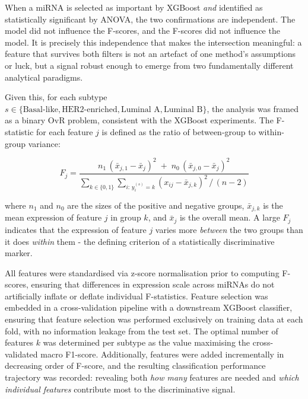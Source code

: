 When a miRNA is selected as important by XGBoost \textit{and} identified as statistically
significant by ANOVA, the two confirmations are independent. The model did not influence
the F-scores, and the F-scores did not influence the model. It is precisely this
independence that makes the intersection meaningful: a feature that survives both filters
is not an artefact of one method's assumptions or luck, but a signal robust enough to emerge
from two fundamentally different analytical paradigms.
 
Given this, for each subtype $s \in \{\text{Basal-like}, \text{HER2-enriched}, \text{Luminal~A},
\text{Luminal~B}\}$, the analysis was framed as a binary OvR problem, consistent with
the XGBoost experiments. The F-statistic for each feature $j$ is defined as the ratio
of between-group to within-group variance:
 
\begin{equation}
F_j = \frac{n_1\,(\bar{x}_{j,1} - \bar{x}_j)^2 \;+\; n_0\,(\bar{x}_{j,0} - \bar{x}_j)^2}
           {\displaystyle\sum_{k \in \{0,1\}} \sum_{i:\, y_i^{(s)}=k} (x_{ij} - \bar{x}_{j,k})^2 \,/\, (n-2)}
\label{eq:anova}
\end{equation}
 
\noindent where $n_1$ and $n_0$ are the sizes of the positive and negative groups,
$\bar{x}_{j,k}$ is the mean expression of feature $j$ in group $k$, and $\bar{x}_j$
is the overall mean. A large $F_j$ indicates that the expression of feature $j$
varies more \textit{between} the two groups than it does \textit{within} them -
the defining criterion of a statistically discriminative marker.
 
All features were standardised via z-score normalisation prior to computing F-scores,
ensuring that differences in expression scale across miRNAs do not artificially inflate
or deflate individual F-statistics. Feature selection was embedded in a cross-validation
pipeline with a downstream XGBoost classifier, ensuring that feature selection
was performed exclusively on training data at each fold, with no
information leakage from the test set. The optimal number of features $k$ was
determined per subtype as the value maximising the cross-validated macro F1-score.
Additionally, features were added incrementally in decreasing order of F-score, and the
resulting classification performance trajectory was recorded: revealing both
\textit{how many} features are needed and \textit{which individual features}
contribute most to the discriminative signal.
 
